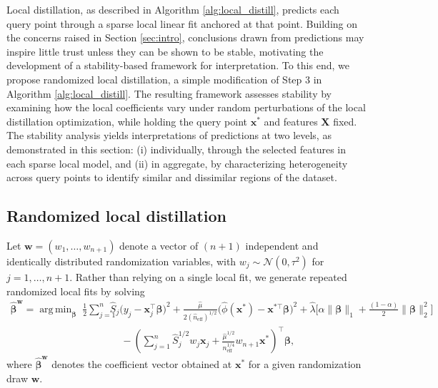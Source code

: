 \documentclass[12pt]{article}
\DeclareMathOperator*{\argmin}{arg\,min}
\theoremstyle{definition}
\begin{document}
Local distillation, as described in Algorithm \ref{alg:local_distill}, predicts each query point through a sparse local linear fit anchored at that point.
Building on the concerns raised in Section \ref{sec:intro}, conclusions drawn from predictions may inspire little trust unless they can be shown to be stable, motivating the development of a stability-based framework for interpretation.
To this end, we propose randomized local distillation, a simple modification of Step 3 in Algorithm \ref{alg:local_distill}.
The resulting framework assesses stability by examining how the local coefficients vary under random perturbations of the local distillation optimization, while holding the query point $\bm{x}^*$ and features $\bm{X}$ fixed. 
The stability analysis yields interpretations of predictions at two levels, as demonstrated in this section: (i) individually, through the selected features in each sparse local model, and (ii) in aggregate, by characterizing heterogeneity across query points to identify similar and dissimilar regions of the dataset.


\subsection{Randomized local distillation}   
\label{sec:randomized_estimator}

Let $\bm w = (w_1, \dots, w_{n+1})$ denote a vector of $(n+1)$ independent and identically distributed randomization variables, with $w_j \sim \mathcal{N}(0, \tau^2)$ for $j = 1, \dots, n+1$.
Rather than relying on a single local fit, we generate repeated randomized local fits by solving
\begin{equation}
\begin{aligned}
  \hat{\bm\beta}^{\bm w} = \argmin_{\bm\beta} \;
   \frac{1}{2}\sum_{j=1}^{n} & \hat{S}_j\bigl(y_j - \bm{x}_j^\top\bm\beta\bigr)^2
    +  \frac{\hat\mu}{2 (\hat n_{\text{eff}})^{1/2}}
          \bigl(\hat\phi(\bm{x}^*) - \bm{x}^{*\top}\bm\beta\bigr)^2
    + \hat\lambda\bigl[\alpha\|\bm\beta\|_1 + \frac{(1-\alpha)}{2}\|\bm\beta\|_2^2\bigr]\\
    &\;\;\;\; - \left(\sum_{j=1}^{n} \hat{S}_j^{1/2} w_j  \bm{x}_j   +  \frac{\hat\mu^{1/2}}{n_{\text{eff}}^{1/4}} w_{n+1} \bm{x}^* \right)^\top \bm\beta,
\end{aligned}    
  \label{eq:randomized_objective}
\end{equation}
where $\hat{\bm\beta}^{\bm w}$ denotes the coefficient vector obtained at $\bm{x}^*$ for a given randomization draw $\bm{w}$.
\end{document}
